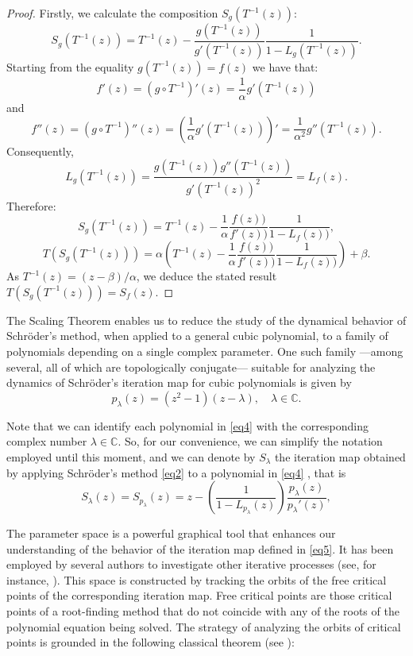 \IfFileExists{aims.cls}{\documentclass{aims}}{\documentclass[11pt]{article}}
\numberwithin{equation}{section}
\theoremstyle{thmstyleone}%
\theoremstyle{thmstyletwo}%
\theoremstyle{thmstylethree}%
\begin{document}
\begin{proof}
Firstly, we calculate the composition $S_g(T^{-1}(z))$:
\begin{equation}
S_g(T^{-1}(z))=T^{-1}(z)-\frac{g(T^{-1}(z))}{g'(T^{-1}(z))}\frac{1}{1-L_g(T^{-1}(z))}.
\end{equation}
Starting from the equality $g(T^{-1}(z))=f(z)$ we have that:
$$		
f'(z)=(g \circ T^{-1})'(z)=\frac{1}{\alpha}g'(T^{-1}(z))
$$
and
$$
		f''(z)=(g \circ T^{-1})''(z)=(\frac{1}{\alpha}g'(T^{-1}(z)))'=\frac{1}{\alpha^2}g''(T^{-1}(z)).
$$
Consequently,
$$
		L_g(T^{-1}(z))=\frac{g(T^{-1}(z))g''(T^{-1}(z))}{g'(T^{-1}(z))^2}=L_f(z).
$$
Therefore:
$$	
		S_g(T^{-1}(z))=T^{-1}(z)-\frac{1}{\alpha}\frac{f(z))}{f'(z))}\frac{1}{1-L_f(z))},
$$
$$
		T(S_g(T^{-1}(z)))=\alpha(T^{-1}(z)-\frac{1}{\alpha}\frac{f(z))}{f'(z))}\frac{1}{1-L_f(z))})+\beta.
$$
As $T^{-1}(z)=(z-\beta)/\alpha$, we deduce the stated result $T(S_g(T^{-1}(z)))=S_f(z)$.
\end{proof}

The Scaling Theorem enables us to reduce the study of the dynamical behavior of Schröder's method, when applied to a general cubic polynomial, to a family of polynomials depending on a single complex parameter. One such family ---among several, all of which are topologically conjugate--- suitable for analyzing the dynamics of Schröder's iteration map for cubic polynomials is given by
\begin{equation}\label{eq4}
p_{\lambda}(z)=(z^2-1)(z-\lambda),\quad \lambda\in \mathbb{C}.
\end{equation}

Note that we can identify each polynomial in \eqref{eq4} with the corresponding complex number $\lambda\in \mathbb{C}$. So, for our convenience, we can simplify the notation employed until this moment, and we can denote by $S_{\lambda}$ the iteration map obtained by applying Schr\"oder's method  \eqref{eq2}  to a polynomial in \eqref{eq4} , that is
\begin{equation}\label{eq5}
S_{\lambda}(z)= S_{p_{\lambda}}(z)=z -\left( \frac{1}{1-  L_{p_{\lambda}}(z)}\right) \frac{{p_{\lambda}}(z)}{{p_{\lambda}}'(z)}, 
\end{equation}

 The parameter space is a powerful graphical tool that enhances our understanding of the behavior of the iteration map defined in \eqref{eq5}. It has been employed by several authors to investigate other iterative processes (see, for instance, \cite{5GV,10Vrscay,13Vrscay0}). This space is constructed by tracking the orbits of the free critical points of the corresponding iteration map. Free critical points are those critical points of a root-finding method that do not coincide with any of the roots of the polynomial equation being solved. The strategy of analyzing the orbits of critical points is grounded in the following classical theorem (see \cite{14Beardon}): 
\end{document}
